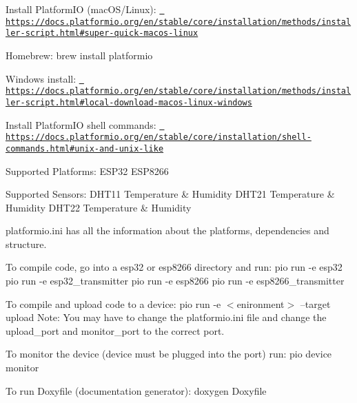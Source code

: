 Install Platform\+IO (mac\+OS/\+Linux)\+: \href{https://docs.platformio.org/en/stable/core/installation/methods/installer-script.html\#super-quick-macos-linux}{\texttt{ https\+://docs.\+platformio.\+org/en/stable/core/installation/methods/installer-\/script.\+html\#super-\/quick-\/macos-\/linux}}

Homebrew\+: brew install platformio

Windows install\+: \href{https://docs.platformio.org/en/stable/core/installation/methods/installer-script.html\#local-download-macos-linux-windows}{\texttt{ https\+://docs.\+platformio.\+org/en/stable/core/installation/methods/installer-\/script.\+html\#local-\/download-\/macos-\/linux-\/windows}}

Install Platform\+IO shell commands\+: \href{https://docs.platformio.org/en/stable/core/installation/shell-commands.html\#unix-and-unix-like}{\texttt{ https\+://docs.\+platformio.\+org/en/stable/core/installation/shell-\/commands.\+html\#unix-\/and-\/unix-\/like}}

Supported Platforms\+: ESP32 ESP8266

Supported Sensors\+: DHT11 Temperature \& Humidity DHT21 Temperature \& Humidity DHT22 Temperature \& Humidity

platformio.\+ini has all the information about the platforms, dependencies and structure.

To compile code, go into a esp32 or esp8266 directory and run\+: pio run -\/e esp32 pio run -\/e esp32\+\_\+transmitter pio run -\/e esp8266 pio run -\/e esp8266\+\_\+transmitter

To compile and upload code to a device\+: pio run -\/e $<$enironment$>$ --target upload Note\+: You may have to change the platformio.\+ini file and change the upload\+\_\+port and monitor\+\_\+port to the correct port.

To monitor the device (device must be plugged into the port) run\+: pio device monitor

To run Doxyfile (documentation generator)\+: doxygen Doxyfile 